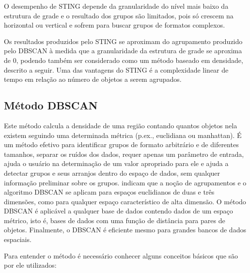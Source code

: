 O desempenho de \acrshort{STING} depende da granularidade do nível mais baixo da estrutura de grade e o resultado dos
grupos são limitados, pois só crescem na horizontal ou vertical e sofrem para buscar grupos de formatos complexos.

Os resultados produzidos pelo \acrshort{STING} se aproximam do agrupamento produzido pelo
\acrshort{DBSCAN} à medida que a granularidade da estrutura de grade se aproxima de 0, podendo
também ser considerado como um método baseado em densidade, descrito a seguir.
Uma das vantagens do \acrshort{STING} é a complexidade linear de tempo em relação ao número de objetos a serem agrupados.

\subsection{Método DBSCAN}
\label{dbscan}

Este método calcula a densidade de uma região contando quantos objetos nela existem seguindo uma determinada métrica (p.ex., euclidiana ou manhattan). É um método efetivo para identificar grupos de formato arbitrário e de diferentes tamanhos, separar os ruídos dos dados, requer apenas um parâmetro de entrada, ajuda o usuário na determinação de um valor apropriado para ele e ajuda a detectar grupos e seus arranjos dentro do espaço de dados, sem qualquer informação preliminar sobre os grupos.
\cite{ESTER1996}  indicam que a noção de agrupamentos e o algoritmo \acrshort{DBSCAN} se aplicam para espaços euclidianos de duas e três dimensões, como para qualquer espaço característico de alta dimensão. O método \acrshort{DBSCAN} é aplicável a qualquer base de dados contendo dados de um espaço métrico, isto é, bases de dados com uma função de distância para pares de objetos. Finalmente, o \acrshort{DBSCAN} é eficiente mesmo para grandes bancos de dados espaciais.

Para entender o método é necessário conhecer alguns conceitos básicos que são por ele utilizados: 

